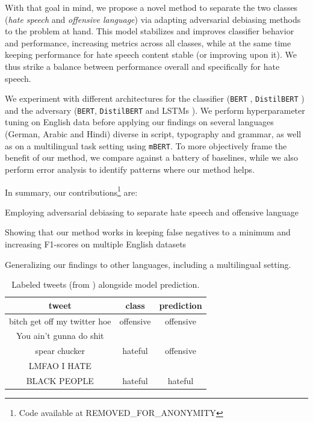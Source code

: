 \documentclass[11pt]{article}
\begin{document}
	With that goal in mind, we propose a novel method to separate the two classes (\textit{hate speech} and \textit{offensive language}) via adapting adversarial debiasing methods to the problem at hand. This model stabilizes and improves classifier behavior and performance, increasing metrics across all classes, while at the same time keeping performance for hate speech content stable (or improving upon it). We thus strike a balance between performance overall and specifically for hate speech.
	
	We experiment with different architectures for the classifier (\texttt{BERT} \cite{devlin2019bert}, \texttt{DistilBERT} \cite{sanh2020distilbert}) and the adversary (\texttt{BERT}, \texttt{DistilBERT} and LSTMs \cite{lstm}). We perform hyperparameter tuning on English data before applying our findings on several languages (German, Arabic and Hindi) diverse in script, typography and grammar, as well as on a multilingual task setting using \texttt{mBERT}. To more objectively frame the benefit of our method, we compare against a battery of baselines, while we also perform error analysis to identify patterns where our method helps.
	
	In summary, our contributions\footnote{Code available at REMOVED\_FOR\_ANONYMITY} are: \begin{enumerate*}[label={\textbf{\roman{*})}}]
		\item Employing adversarial debiasing to separate hate speech and offensive language
		\item Showing that our method works in keeping false negatives to a minimum and increasing F1-scores on multiple English datasets
		\item Generalizing our findings to other languages, including a multilingual setting.
	\end{enumerate*}
	
	\begin{table}
		\centering
		\small
		\footnotesize
		\begin{tabular}{ccc}
			\hline\rule{0pt}{0.85\normalbaselineskip} \textbf{tweet} & \textbf{class} & \textbf{prediction} \\
			\hline\rule{0pt}{0.85\normalbaselineskip} bitch get off my twitter hoe  & offensive & offensive\\
			\hline\rule{0pt}{0.85\normalbaselineskip} You ain't gunna do shit\\spear chucker & hateful & offensive\\
			\hline\rule{0pt}{0.85\normalbaselineskip} LMFAO I HATE\\BLACK PEOPLE & hateful & hateful\\\hline
		\end{tabular}
		\caption{Labeled tweets (from \citet{davidson}) alongside model prediction.
			\label{example}}
	\end{table}
	
\end{document}
